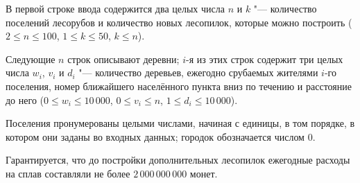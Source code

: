 В первой строке ввода содержится два целых числа $n$ и $k$ "--- количество
поселений лесорубов и количество новых лесопилок, которые можно построить
($2 \le n \le 100$, $1 \le k \le 50$, $k \le n$).

Следующие $n$ строк описывают деревни; $i$-я из этих строк содержит три
целых числа $w_i$, $v_i$ и $d_i$ "--- количество деревьев, ежегодно срубаемых
жителями $i$-го поселения, номер ближайшего населённого пункта вниз по
течению и расстояние до него ($0 \le w_i \le 10\,000$, $0 \le v_i \le n$,
$1 \le d_i \le 10\,000$).

Поселения пронумерованы целыми числами, начиная с единицы, в том порядке,
в котором они заданы во входных данных; городок обозначается числом $0$.

Гарантируется, что до постройки дополнительных лесопилок ежегодные
расходы на сплав составляли не более $2\,000\,000\,000$ монет.

